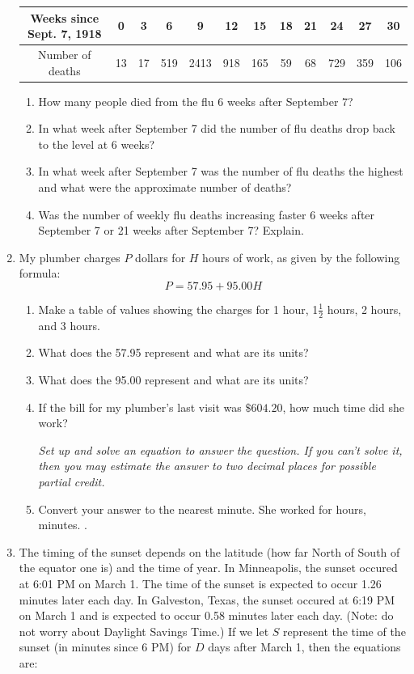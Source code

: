 \documentclass[12pt]{article}
\begin{document}
\begin{enumerate}
\begin{tabular} {|c|c|c|c|c |c|c|c|c|c |c|c|} \hline
Weeks since Sept. 7, 1918 & 0 & 3 & 6  & 9  & 12  & 15  & 18 & 21  & 24  & 27  & 30 \\ \hline
Number of deaths &13 & 17 & 519 & 2413 & 918 & 165 & 59 & 68 & 729 & 359 & 106 \\ \hline
\end{tabular}

\begin{enumerate}
\item How many people died from the flu 6 weeks after September 7?
\vfill
\item In what week after September 7 did the number of flu deaths drop back to the level at 6 weeks?
\vfill
\item In what week after September 7 was the number of flu deaths the highest and what were the approximate number of deaths?
\vfill
\item Was the number of weekly flu deaths increasing faster 6 weeks after September 7 or 21 weeks after September 7?  Explain.
\vfill
\end{enumerate}

\newpage %

\item My plumber charges $P$ dollars for $H$ hours of work, as given by the following formula:
$$P = 57.95 + 95.00H$$

\begin{enumerate}
\item Make a table of values showing the charges for 1 hour, 1$\frac{1}{2}$ hours, 2 hours, and 3 hours.
\vfill
\item What does the 57.95 represent and what are its units?
\vfill
\item What does the 95.00 represent and what are its units?
\vfill
\item If the bill for my plumber's last visit was $\$604.20$, how much time did she work?

\emph{Set up and solve an equation to answer the question.  If you can't solve it, then you may estimate the answer to two decimal places for possible partial credit.}
\vfill
\vfill
\vfill
\item Convert your answer to the nearest minute.
\vfill
She worked for \hrulefill hours, \hrulefill minutes. \hspace{3in}.
\end{enumerate}

\newpage %
\item The timing of the sunset depends on the latitude (how far North of South of the equator one is) and the time of year.  In Minneapolis, the sunset occured at 6:01 PM on March 1.  The time of the sunset is expected to occur 1.26 minutes later each day.  In Galveston, Texas, the sunset occured at 6:19 PM on March 1 and is expected to occur 0.58 minutes later each day.  (Note: do not worry about Daylight Savings Time.) If we let $S$ represent the time of the sunset (in minutes since 6 PM) for $D$ days after March 1, then the equations are:


\end{enumerate}
\end{document}
